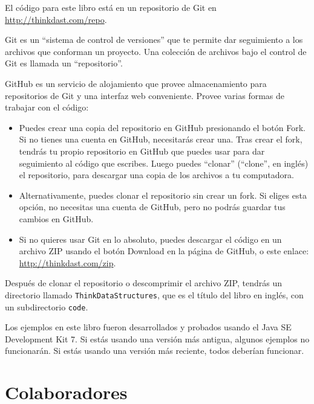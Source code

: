 \documentclass[12pt]{book}
\theoremstyle{exercise}
\begin{document}
El código para este libro está en un repositorio de Git en
\url{http://thinkdast.com/repo}.


Git es un ``sistema de control de versiones'' que te permite dar seguimiento a los
archivos que conforman un proyecto. Una colección de archivos bajo el control
de Git es llamada un ``repositorio''.


GitHub es un servicio de alojamiento que provee almacenamiento para repositorios
de Git y una interfaz web conveniente. Provee varias formas de trabajar con el código:

\begin{itemize}

\item Puedes crear una copia del repositorio en GitHub presionando el botón {\sf Fork}. 
Si no tienes una cuenta en GitHub, necesitarás crear una. Tras crear el fork, 
tendrás tu propio repositorio en GitHub que puedes usar para dar seguimiento al código
que escribes. Luego puedes ``clonar'' (``clone'', en inglés) el repositorio, para descargar una
copia de los archivos a tu computadora.


\item Alternativamente, puedes clonar el repositorio sin crear un fork. Si eliges esta opción,
no necesitas una cuenta de GitHub, pero no podrás guardar tus cambios en GitHub.

\item Si no quieres usar Git en lo absoluto, puedes descargar el código en un archivo ZIP usando el
botón {\sf Download} en la página de GitHub, o este enlace: \url{http://thinkdast.com/zip}.

\end{itemize}

Después de clonar el repositorio o descomprimir el archivo ZIP, tendrás un directorio llamado {\tt ThinkDataStructures},
que es el título del libro en inglés, con un subdirectorio {\tt code}.

Los ejemplos en este libro fueron desarrollados y probados usando el Java SE
Development Kit 7.  Si estás usando una versión más antigua, algunos ejemplos
no funcionarán. Si estás usando una versión más reciente, todos deberían funcionar.


\section*{Colaboradores}
\end{document}
